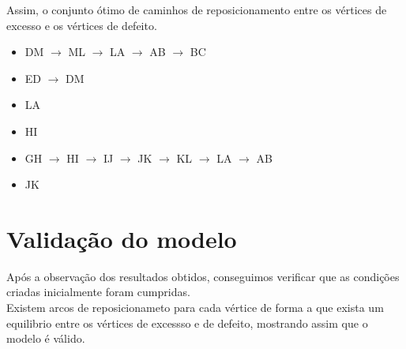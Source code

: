 \documentclass[a4paper]{report}
\begin{document}
\begin{figure}[H]
\centering
{}
\end{figure}
Assim, o conjunto ótimo de caminhos de reposicionamento entre os vértices de
excesso e os vértices de defeito.

\begin{itemize}
        \item DM $\rightarrow$ ML $\rightarrow$ LA $\rightarrow$ AB $\rightarrow$ BC
        \item ED $\rightarrow$ DM 
        \item LA
        \item HI
        \item GH $\rightarrow$ HI $\rightarrow$ IJ $\rightarrow$ JK $\rightarrow$ KL $\rightarrow$ LA $\rightarrow$ AB
        \item JK
\end{itemize}

\section{Validação do modelo}
Após a observação dos resultados obtidos, conseguimos verificar que as condições
criadas inicialmente foram cumpridas.\\
Existem arcos de reposicionameto para cada vértice de forma a que exista um
equilibrio entre os vértices de excessso e de defeito, mostrando assim que o
modelo é válido.
\end{document}
